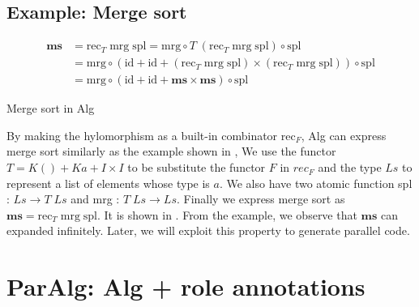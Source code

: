 \subsection{Example: Merge sort}
\begin{listing}[ht]
\begin{align*}
\mathbf{ms} &= \text{rec}_T \; \text{mrg} \; \text{spl} = \text{mrg} \circ T \; (\text{rec}_T \; \text{mrg} \; \text{spl}) \circ \text{spl} \\
& = \text{mrg} \circ (\text{id} + \text{id} + (\text{rec}_T \; \text{mrg} \; \text{spl}) \times (\text{rec}_T \; \text{mrg} \; \text{spl})) \circ \text{spl} \\
& = \text{mrg}  \circ (\text{id} + \text{id} + \mathbf{ms} \times \mathbf{ms}) \circ \text{spl}
\end{align*}
\caption{Merge sort in Alg} \label{p:pal:c5}
\end{listing}

By making the hylomorphism as a built-in combinator $\text{rec}_F$, Alg can express merge sort similarly as the example shown in , We use the functor $T = K () + K a + I \times I $ to be substitute the functor $F$ in $rec_F$ and the type $Ls$ to represent a list of elements whose type is $a$. We also have two atomic function spl : $Ls \rightarrow T \; Ls$ and mrg : $T \; Ls \rightarrow Ls$. Finally we express merge sort as $\mathbf{ms} = \text{rec}_T \; \text{mrg} \; \text{spl}$. It is shown in . From the example, we observe that $\mathbf{ms}$ can expanded infinitely. Later, we will exploit this property to generate parallel code. 

\section{ParAlg: Alg + role annotations}
